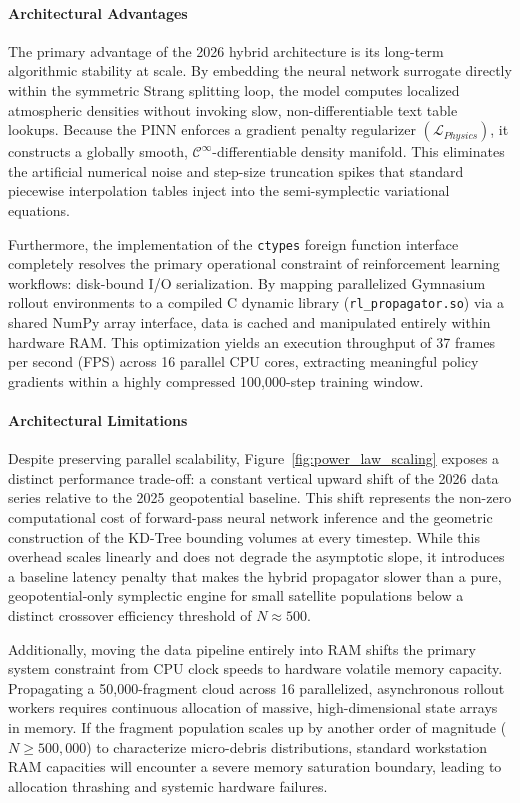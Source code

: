\documentclass[letterpaper, preprint, 11pt]{AAS}
\begin{document}
\paragraph{Architectural Advantages}
The primary advantage of the 2026 hybrid architecture is its long-term algorithmic stability at scale. By embedding the neural network surrogate directly within the symmetric Strang splitting loop, the model computes localized atmospheric densities without invoking slow, non-differentiable text table lookups. Because the PINN enforces a gradient penalty regularizer $(\mathcal{L}_{Physics})$, it constructs a globally smooth, $\mathcal{C}^\infty$-differentiable density manifold. This eliminates the artificial numerical noise and step-size truncation spikes that standard piecewise interpolation tables inject into the semi-symplectic variational equations. 

Furthermore, the implementation of the \texttt{ctypes} foreign function interface completely resolves the primary operational constraint of reinforcement learning workflows: disk-bound I/O serialization. By mapping parallelized Gymnasium rollout environments to a compiled C dynamic library (\texttt{rl\_propagator.so}) via a shared NumPy array interface, data is cached and manipulated entirely within hardware RAM. This optimization yields an execution throughput of 37 frames per second (FPS) across 16 parallel CPU cores, extracting meaningful policy gradients within a highly compressed 100,000-step training window.

\paragraph{Architectural Limitations}
Despite preserving parallel scalability, Figure~\ref{fig:power_law_scaling} exposes a distinct performance trade-off: a constant vertical upward shift of the 2026 data series relative to the 2025 geopotential baseline. This shift represents the non-zero computational cost of forward-pass neural network inference and the geometric construction of the KD-Tree bounding volumes at every timestep. While this overhead scales linearly and does not degrade the asymptotic slope, it introduces a baseline latency penalty that makes the hybrid propagator slower than a pure, geopotential-only symplectic engine for small satellite populations below a distinct crossover efficiency threshold of $N \approx 500$.

Additionally, moving the data pipeline entirely into RAM shifts the primary system constraint from CPU clock speeds to hardware volatile memory capacity. Propagating a 50,000-fragment cloud across 16 parallelized, asynchronous rollout workers requires continuous allocation of massive, high-dimensional state arrays in memory. If the fragment population scales up by another order of magnitude ($N \ge 500,000$) to characterize micro-debris distributions, standard workstation RAM capacities will encounter a severe memory saturation boundary, leading to allocation thrashing and systemic hardware failures. 
\end{document}
